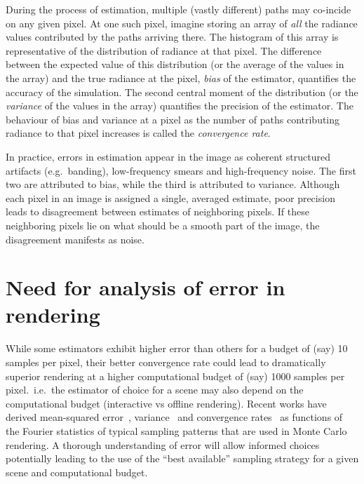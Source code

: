 \documentclass{acmsiggraph}
\begin{document}

During the process of estimation, multiple (vastly different) paths may co-incide on any given pixel. At one such pixel, imagine storing an array of \textit{all} the radiance values contributed by the paths arriving there. The histogram of this array is representative of the distribution of radiance at that pixel. The difference between the expected value of this distribution (or the average of the values in the array) and the true radiance at the pixel, \textit{bias} of the estimator, quantifies the accuracy of the simulation.  The second central moment of the distribution (or the \textit{variance} of the values in the array) quantifies the precision of the estimator. The behaviour of bias and variance at a pixel as the number of paths contributing radiance to that pixel increases is called the \textit{convergence rate}. 

In practice, errors in estimation appear in the image as coherent structured artifacts (e.g.~banding), low-frequency smears and high-frequency noise. The first two are attributed to bias, while the third is attributed to variance. Although each pixel in an image is assigned a single, averaged estimate, poor precision leads to disagreement between estimates of neighboring pixels. If these neighboring pixels lie on what should be a smooth part of the image, the disagreement manifests as noise.

\section{Need for analysis of error in rendering}

While some estimators exhibit higher error than others for a budget of (say) 10 samples per pixel, their better convergence rate could lead to dramatically superior rendering at a higher computational budget of (say) 1000 samples per pixel.~i.e.~the estimator of choice for a scene may also depend on the computational budget (interactive vs offline rendering). Recent works have derived mean-squared error~\cite{durand2011frequency,Ramamoorthi:2012}, variance~\cite{Subr:2013:FAS,subr14error} and convergence rates~\cite{Pilleboue:2015:VAM} as functions of the Fourier statistics of typical sampling patterns that are used in Monte Carlo rendering. A thorough understanding of error will allow informed choices potentially leading to the use of the ``best available'' sampling strategy for a given scene and computational budget. 
\end{document}

